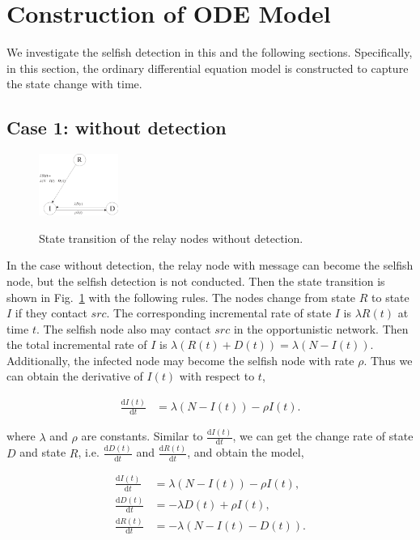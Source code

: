 \section{Construction of ODE Model}
\label{sec:ode_model}
We investigate the selfish detection in this and the following sections.
Specifically, in this section, the ordinary differential equation model
is constructed to capture the state change with time.
\subsection{Case 1: without detection}
\label{subsec:wo_detc}
\begin{figure}
  \centering
  {\includegraphics[width=0.23\textwidth]
  {fig/state_transition_no_detect.eps}}
     \caption{State transition of the relay nodes without detection.}
     \label{fig:ss_wo_dt}
\end{figure}
In the case without detection,
the relay node with message can become the selfish node,
but the selfish detection is not conducted.
Then the state transition is shown
in Fig.~\ref{fig:ss_wo_dt} with the following rules.
The nodes change from state $R$ to state $I$ if they contact $src$.
The corresponding incremental rate of state $I$ is $\lambda R(t)$ at time $t$.
The selfish node also may contact $src$ in the opportunistic network.
Then the total incremental rate of $I$ is
$\lambda (R(t)+D(t))=\lambda (N-I(t))$.
Additionally, the infected node may become the selfish node with rate $\rho$.
Thus we can obtain the derivative of $I(t)$ with respect to $t$,
\begin{small}
\begin{equation}
\nonumber
\begin{aligned}
\frac{\mathrm{d} I(t)}{\mathrm{d} t} &= \lambda (N-I(t)) - \rho I(t).
\end{aligned}
\end{equation}
\end{small}
where $\lambda$ and $\rho$ are constants.
Similar to $\frac{\mathrm{d} I(t)}{\mathrm{d} t}$,
we can get the change rate of state $D$ and state $R$,
i.e. $\frac{\mathrm{d} D(t)}{\mathrm{d} t}$ and
$\frac{\mathrm{d} R(t)}{\mathrm{d} t}$,
and obtain the model,
\begin{small}
\begin{equation}
\label{eq:IDR_wo}
\begin{aligned}
\frac{\mathrm{d} I(t)}{\mathrm{d} t} &=  \lambda (N-I(t)) - \rho I(t),\\
\frac{\mathrm{d} D(t)}{\mathrm{d} t} &= - \lambda D(t) + \rho I(t),\\
\frac{\mathrm{d} R(t)}{\mathrm{d} t} &= - \lambda (N-I(t)-D(t)).
\end{aligned}
\end{equation}
\end{small}
